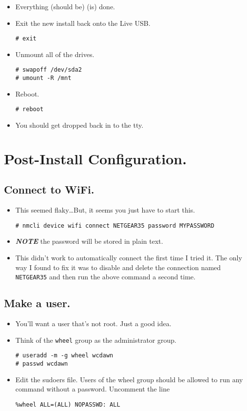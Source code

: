 \documentclass{article}
\begin{document}
\begin{itemize}
  \item Everything (should be) (is) done.
  \item Exit the new install back onto the Live USB.
\begin{verbatim}
# exit
\end{verbatim}
\item Unmount all of the drives.
\begin{verbatim}
# swapoff /dev/sda2
# umount -R /mnt
\end{verbatim}
\item Reboot.
\begin{verbatim}
# reboot
\end{verbatim}
  \item You should get dropped back in to the tty.
\end{itemize}

\section{Post-Install Configuration.}

  \subsection{Connect to WiFi.}

  \begin{itemize}
    \item This seemed flaky\ldots But, it seems you just have to start this.
\begin{verbatim}
# nmcli device wifi connect NETGEAR35 password MYPASSWORD
\end{verbatim}
    \item \textbf{\emph{NOTE}} the password will be stored in plain text.
    \item This didn't work to automatically connect the first time I tried it.
      The only way I found to fix it was to disable and delete the connection named \verb|NETGEAR35| and then run the above command a second time.
  \end{itemize}

  \subsection{Make a user.}

  \begin{itemize}
    \item You'll want a user that's not root.
      Just a good idea.
    \item Think of the \verb|wheel| group as the administrator group.
\begin{verbatim}
# useradd -m -g wheel wcdawn
# passwd wcdawn
\end{verbatim}
    \item Edit the sudoers file.
      Users of the wheel group should be allowed to run any command without a password.
      Uncomment the line
\begin{verbatim}
%wheel ALL=(ALL) NOPASSWD: ALL
\end{verbatim}
  \end{itemize}
\end{document}
